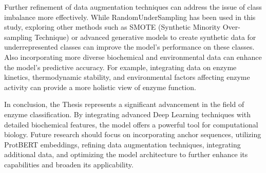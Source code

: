 Further refinement of data augmentation techniques can address the issue of class imbalance more effectively. While RandomUnderSampling has been used in this study, exploring other methods such as SMOTE (Synthetic Minority Over-sampling Technique) or advanced generative models to create synthetic data for underrepresented classes can improve the model's performance on these classes. Also incorporating more diverse biochemical and environmental data can enhance the model's predictive accuracy. For example, integrating data on enzyme kinetics, thermodynamic stability, and environmental factors affecting enzyme activity can provide a more holistic view of enzyme function.

In conclusion, the Thesis represents a significant advancement in the field of enzyme classification. By integrating advanced Deep Learning techniques with detailed biochemical features, the model offers a powerful tool for computational biology. Future research should focus on incorporating anchor sequences, utilizing ProtBERT embeddings, refining data augmentation techniques, integrating additional data, and optimizing the model architecture to further enhance its capabilities and broaden its applicability.